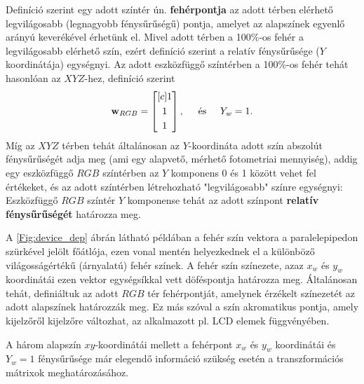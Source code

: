 Definíció szerint egy adott színtér ún. \textbf{fehérpontja} az adott térben elérhető legvilágosabb (legnagyobb fénysűrűségű) pontja, amelyet az alapszínek egyenlő arányú keverékével érhetünk el.
Mivel adott térben a 100\%-os fehér a legvilágosabb elérhető szín, ezért definíció szerint a relatív fénysűrűsége ($Y$ koordinátája) egységnyi.
Az adott eszközfüggő színtérben a 100\%-os fehér tehát hasonlóan az $XYZ$-hez, definíció szerint 
\begin{equation}
\mathbf{w}_{RGB} = \begin{bmatrix}[c]
       1 \\[0.3em]
       1 \\[0.3em]
       1 \end{bmatrix}, \hspace{5mm} \text{és} \hspace{5mm} 
Y_w = 1.
\end{equation}
Míg az $XYZ$ térben tehát általánosan az $Y$-koordináta adott szín abszolút fénysűrűségét adja meg (ami egy alapvető, mérhető fotometriai mennyiség), addig egy eszközfüggő $RGB$ színtérben az $Y$ komponens 0 és 1 között vehet fel értékeket, és az adott színtérben létrehozható "legvilágosabb" színre egységnyi:
Eszközfüggő $RGB$ színtér $Y$ komponense tehát az adott színpont \textbf{relatív fénysűrűségét} határozza meg.
 
A \ref{Fig:device_dep} ábrán látható példában a fehér szín vektora a paralelepipedon szürkével jelölt főátlója, ezen vonal mentén helyezkednek el a különböző világosságértékű (árnyalatú) fehér színek.
A fehér szín színezete, azaz $x_w$ és $y_w$ koordinátái ezen vektor egységsíkkal vett döféspontja határozza meg.
Általánosan tehát, definiáltuk az adott $RGB$ tér fehérpontját, amelynek érzékelt színezetét az adott alapszínek határozzák meg.
Ez más szóval a szín akromatikus pontja, amely kijelzőről kijelzőre változhat, az alkalmazott pl. LCD elemek függvényében.

A három alapszín $xy$-koordinátái mellett a fehérpont $x_w$ és $y_w$ koordinátái és $Y_w = 1$ fénysűrűsége már elegendő információ szükség esetén a transzformációs mátrixok meghatározásához.

